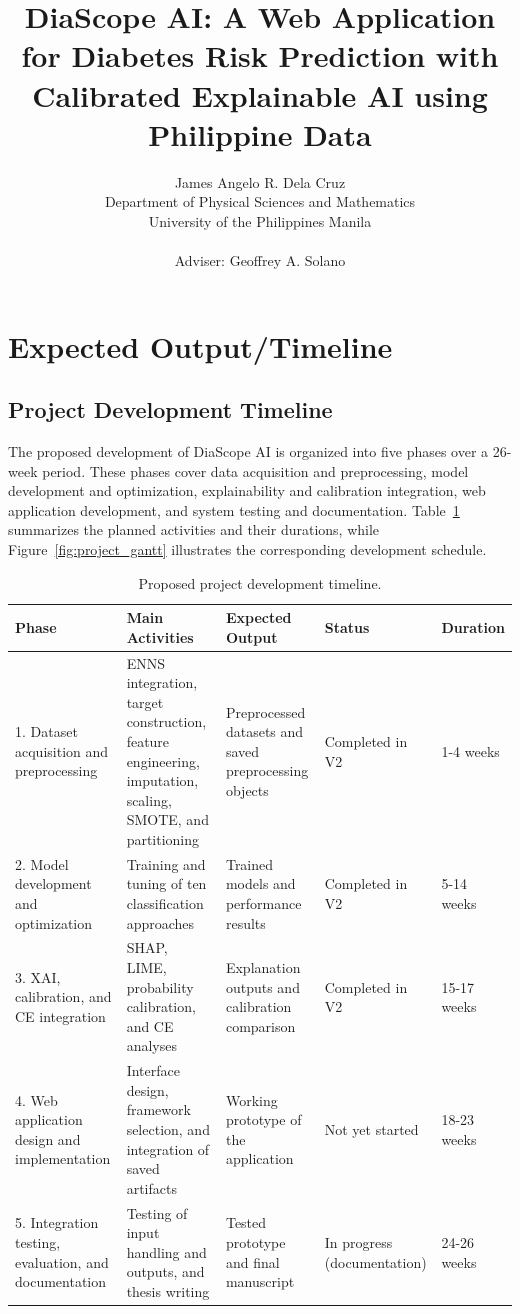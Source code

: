 \documentclass[11pt,a4paper,titlepage]{article}
\title {DiaScope AI: A Web Application for Diabetes Risk Prediction with Calibrated Explainable AI using Philippine Data}
\author {James Angelo R. Dela Cruz \\ Department of Physical Sciences and Mathematics \\ University of the Philippines Manila \\ \\
Adviser: Geoffrey A. Solano}
\date{}
\let\stdsection\section
\renewcommand\section{\newpage\stdsection}
\begin{document}
\maketitle
\tableofcontents






\section{Expected Output/Timeline}

\subsection{Project Development Timeline}

The proposed development of DiaScope AI is organized into five phases over a 26-week period. These phases cover data acquisition and preprocessing, model development and optimization, explainability and calibration integration, web application development, and system testing and documentation. Table~\ref{tab:timeline} summarizes the planned activities and their durations, while Figure~\ref{fig:project_gantt} illustrates the corresponding development schedule.

\begin{table}[H]
\centering
\caption{Proposed project development timeline.}
\label{tab:timeline}
\begin{tabular}{p{2.5cm}p{4.2cm}p{3.2cm}p{2.1cm}p{1.2cm}}
\hline
\textbf{Phase} & \textbf{Main Activities} & \textbf{Expected Output} & \textbf{Status} & \textbf{Duration} \\
\hline
1. Dataset acquisition and preprocessing & ENNS integration, target construction, feature engineering, imputation, scaling, SMOTE, and partitioning & Preprocessed datasets and saved preprocessing objects & Completed in V2 & 1-4 weeks \\
2. Model development and optimization & Training and tuning of ten classification approaches & Trained models and performance results & Completed in V2 & 5-14 weeks \\
3. XAI, calibration, and CE integration & SHAP, LIME, probability calibration, and CE analyses & Explanation outputs and calibration comparison & Completed in V2 & 15-17 weeks \\
4. Web application design and implementation & Interface design, framework selection, and integration of saved artifacts & Working prototype of the application & Not yet started & 18-23 weeks \\
5. Integration testing, evaluation, and documentation & Testing of input handling and outputs, and thesis writing & Tested prototype and final manuscript & In progress (documentation) & 24-26 weeks \\
\hline
\end{tabular}
\end{table}
\end{document}
